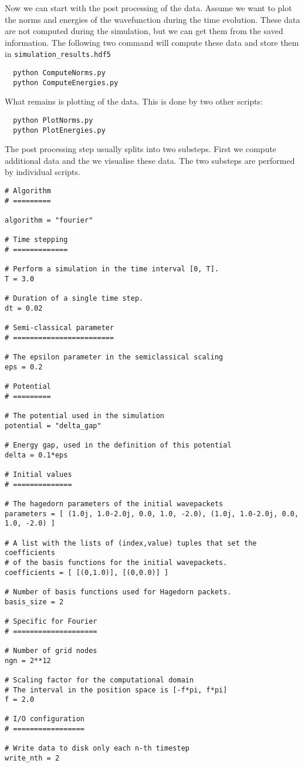 \documentclass[a4paper,10pt]{report}
\begin{document}
Now we can start with the post processing of the data. Assume we want to plot
the norms and energies of the wavefunction during the time evolution. These data
are not computed during the simulation, but we can get them from the saved
information. The following two command will compute these data and store them
in \texttt{simulation\_results.hdf5}

\begin{verbatim}
  python ComputeNorms.py
  python ComputeEnergies.py
\end{verbatim}

What remains is plotting of the data. This is done by two other scripts:

\begin{verbatim}
  python PlotNorms.py
  python PlotEnergies.py
\end{verbatim}

The post processing step usually splits into two substeps. First we compute additional
data and the we visualise these data. The two substeps are performed by individual
scripts.

% 
\begin{lstlisting}[float=tp,frame=single,label=lstparameters01,caption={Sample configuration \texttt{parameters\_01.py}}]
# Algorithm
# =========

algorithm = "fourier"

# Time stepping
# =============

# Perform a simulation in the time interval [0, T].
T = 3.0

# Duration of a single time step.
dt = 0.02

# Semi-classical parameter
# ========================

# The epsilon parameter in the semiclassical scaling
eps = 0.2

# Potential
# =========

# The potential used in the simulation
potential = "delta_gap"

# Energy gap, used in the definition of this potential
delta = 0.1*eps

# Initial values
# ==============

# The hagedorn parameters of the initial wavepackets
parameters = [ (1.0j, 1.0-2.0j, 0.0, 1.0, -2.0), (1.0j, 1.0-2.0j, 0.0, 1.0, -2.0) ]

# A list with the lists of (index,value) tuples that set the coefficients
# of the basis functions for the initial wavepackets.
coefficients = [ [(0,1.0)], [(0,0.0)] ]

# Number of basis functions used for Hagedorn packets.
basis_size = 2

# Specific for Fourier
# ====================

# Number of grid nodes
ngn = 2**12

# Scaling factor for the computational domain
# The interval in the position space is [-f*pi, f*pi]
f = 2.0

# I/O configuration
# =================

# Write data to disk only each n-th timestep
write_nth = 2
\end{lstlisting}
\end{document}
